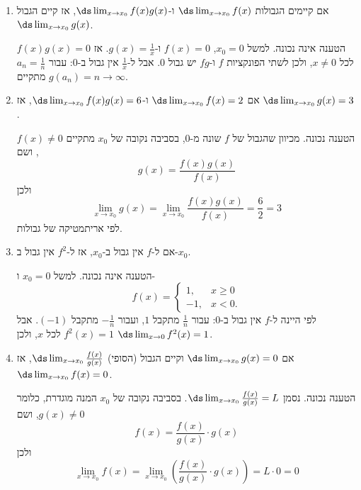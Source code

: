 \begin{enumerate}
\begin{solbox}
שימו לב כי כל עוד
$\ds{\lim_{x\to x_0}}f(x)$
לא קיים, הדוגמא
$g=-f$
"תעבוד".
\end{solbox}
\fi
\item אם קיימים הגבולות $\ds\lim_{x\to x_0}f(x)$ ו-$\ds\lim_{x\to x_0}f(x)g(x)$, אז קיים הגבול $\ds\lim_{x\to x_0}g(x)$.
\ifsol
\begin{solbox}
הטענה אינה נכונה. למשל $x_0=0$, $f(x)=0$ ו-$g(x)=\frac1x$. אז $f(x)g(x)=0$ לכל $x\ne0$, ולכן לשתי הפונקציות $f$ ו-$fg$ יש גבול $0$. אבל ל-$\frac1x$ אין גבול ב-$0$: עבור $a_n=\frac1n$ מתקיים $g(a_n)=n\to\infty$.
\end{solbox}
\fi
\item אם $\ds\lim_{x\to x_0}f(x)=2$ ו-$\ds\lim_{x\to x_0}f(x)g(x)=6$, אז $\ds\lim_{x\to x_0}g(x)=3$.
\ifsol
{}
\begin{solbox}
הטענה נכונה. מכיוון שהגבול של $f$ שונה מ-$0$, בסביבה נקובה של $x_0$ מתקיים $f(x)\ne0$, ושם
\[g(x)=\frac{f(x)g(x)}{f(x)}\]
ולכן
\[\lim_{x\to x_0}g(x)=\lim_{x\to x_0}\frac{f(x)g(x)}{f(x)}=\frac62=3\]
לפי אריתמטיקה של גבולות.
\end{solbox}
\fi
\item אם ל-$f$ אין גבול ב-$x_0$, אז ל-$f^2$ אין גבול ב-$x_0$.
\ifsol
\begin{solbox}
הטענה אינה נכונה. למשל $x_0=0$ ו-
\[f(x)=\begin{cases}1, & x\ge0\\ -1, & x<0.\end{cases}\]
לפי היינה ל-$f$ אין גבול ב-$0$: עבור $\frac1n$ מתקבל $1$, ועבור $-\frac1n$ מתקבל $(-1)$. אבל $f^2(x)=1$ לכל $x$, ולכן $\ds\lim_{x\to0}f^2(x)=1$.
\end{solbox}
\fi
\item אם $\ds\lim_{x\to x_0}g(x)=0$ וקיים הגבול (הסופי) $\ds\lim_{x\to x_0}\frac{f(x)}{g(x)}$, אז $\ds\lim_{x\to x_0}f(x)=0$.
\ifsol
\begin{solbox}
הטענה נכונה. נסמן $\ds\lim_{x\to x_0}\frac{f(x)}{g(x)}=L$. בסביבה נקובה של $x_0$ המנה מוגדרת, כלומר $g(x)\ne0$, ושם
\[f(x)=\frac{f(x)}{g(x)}\cdot g(x)\]
ולכן
\[\lim_{x\to x_0}f(x)=\lim_{x\to x_0}\left(\frac{f(x)}{g(x)}\cdot g(x)\right)=L\cdot0=0\]
\end{solbox}
\fi
\end{enumerate}
